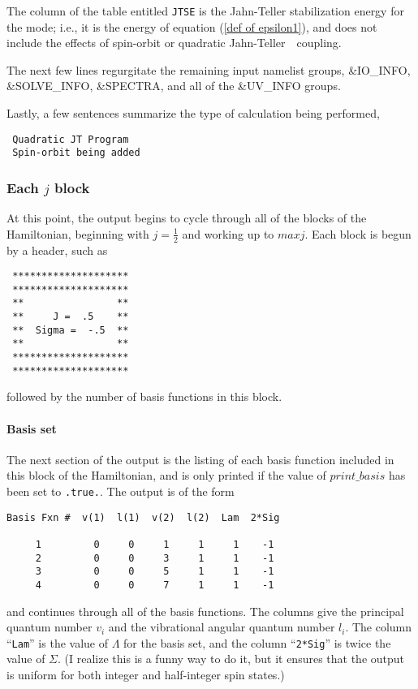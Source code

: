 \documentclass{article}
\newcommand{\JT}{Jahn-Teller\ }
\begin{document}
The column of the table entitled {\tt JTSE} is the Jahn-Teller
stabilization energy for the mode; i.e., it is the energy of equation
(\ref{def of epsilon1}), and does not include the effects of
spin-orbit or quadratic \JT\ coupling.

The next few lines regurgitate the remaining input namelist groups, 
 \&IO\_INFO, \&SOLVE\_INFO, \&SPECTRA, and all of the \&UV\_INFO
 groups. 

Lastly, a few sentences summarize the type of calculation being
performed,
\begin{verbatim}
 Quadratic JT Program
 Spin-orbit being added
\end{verbatim}

\subsubsection{Each $j$ block}

At this point, the output begins to cycle through all of the blocks of
the Hamiltonian, beginning with $j=\frac12 $ and working up to
$maxj$. Each block is begun by a header, such as
\begin{verbatim}
 ********************
 ********************
 **                **
 **     J =  .5    **
 **  Sigma =  -.5  **
 **                **
 ********************
 ********************
\end{verbatim}
followed by the number of basis functions in this block.

\paragraph{Basis set}
The next section of the output is the listing of each basis function
included in this block of the Hamiltonian, and is only printed if the
value of $print\_basis$ has been set to {\tt .true.}. The output is of
the form
\begin{verbatim}
Basis Fxn #  v(1)  l(1)  v(2)  l(2)  Lam  2*Sig
 
     1         0     0     1     1     1    -1
     2         0     0     3     1     1    -1
     3         0     0     5     1     1    -1
     4         0     0     7     1     1    -1
\end{verbatim}
and continues through all of the basis functions. The columns give the
principal quantum number $v_i$ and the vibrational angular quantum
number $l_i$. The column ``{\tt Lam}'' is the value of $\Lambda $ for
the basis set, and the column ``{\tt 2*Sig}'' is twice the value of
$\Sigma $. (I realize this is a funny way to do it, but it ensures
that the output is uniform for both integer and half-integer spin states.)
\end{document}
